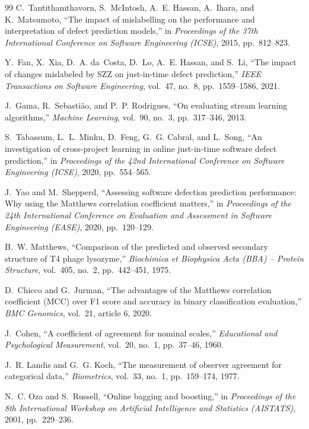 \documentclass[12pt,a4paper,oneside]{report}
\begin{document}
{\begin{thebibliography}{99}
C.~Tantithamthavorn, S.~McIntosh, A.~E. Hassan, A.~Ihara, and K.~Matsumoto,
``The impact of mislabelling on the performance and interpretation of defect
prediction models,'' in \emph{Proceedings of the 37th International Conference
on Software Engineering (ICSE)}, 2015, pp.~812--823.

Y.~Fan, X.~Xia, D.~A. da~Costa, D.~Lo, A.~E. Hassan, and S.~Li, ``The impact of
changes mislabeled by SZZ on just-in-time defect prediction,'' \emph{IEEE
Transactions on Software Engineering}, vol.~47, no.~8, pp.~1559--1586, 2021.

J.~Gama, R.~Sebasti\~{a}o, and P.~P. Rodrigues, ``On evaluating stream learning
algorithms,'' \emph{Machine Learning}, vol.~90, no.~3, pp.~317--346, 2013.

S.~Tabassum, L.~L. Minku, D.~Feng, G.~G. Cabral, and L.~Song, ``An
investigation of cross-project learning in online just-in-time software defect
prediction,'' in \emph{Proceedings of the 42nd International Conference on
Software Engineering (ICSE)}, 2020, pp.~554--565.

J.~Yao and M.~Shepperd, ``Assessing software defection prediction performance:
Why using the Matthews correlation coefficient matters,'' in \emph{Proceedings
of the 24th International Conference on Evaluation and Assessment in Software
Engineering (EASE)}, 2020, pp.~120--129.

B.~W. Matthews, ``Comparison of the predicted and observed secondary structure
of T4 phage lysozyme,'' \emph{Biochimica et Biophysica Acta (BBA) -- Protein
Structure}, vol.~405, no.~2, pp.~442--451, 1975.

D.~Chicco and G.~Jurman, ``The advantages of the Matthews correlation
coefficient (MCC) over F1 score and accuracy in binary classification
evaluation,'' \emph{BMC Genomics}, vol.~21, article 6, 2020.

J.~Cohen, ``A coefficient of agreement for nominal scales,'' \emph{Educational
and Psychological Measurement}, vol.~20, no.~1, pp.~37--46, 1960.

J.~R. Landis and G.~G. Koch, ``The measurement of observer agreement for
categorical data,'' \emph{Biometrics}, vol.~33, no.~1, pp.~159--174, 1977.

N.~C. Oza and S.~Russell, ``Online bagging and boosting,'' in
\emph{Proceedings of the 8th International Workshop on Artificial Intelligence
and Statistics (AISTATS)}, 2001, pp.~229--236.


\end{thebibliography}}
\end{document}
